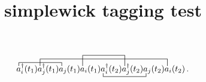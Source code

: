\documentclass{article}
\title{simplewick tagging test}
\begin{document}
\[
\contraction{}{a}{{}^{\dagger}_i(t_1)a^{\dagger}_j(t_1)}{a}
%
\contraction[2ex]{a^{\dagger}_i(t_1)}{a}{%
{}^{\dagger}_j(t_1)a_j(t_1)a_i(t_1)%
a^{\dagger}_i(t_2)a^{\dagger}_j(t_2)a_j(t_2)}{a}
%
\contraction[3ex]{a^{\dagger}_i(t_1)%
a^{\dagger}_j(t_1)a_j(t_1)}{a}{{}_i(t_1)%
a^{\dagger}_i(t_2)}{a}
%
\bcontraction{a^{\dagger}_i(t_1)%
a^{\dagger}_j(t_1)a_j(t_1)a_i(t_1)}%
{a}{{}^{\dagger}_i(t_2)a^{\dagger}_j(t_2)}{a}
%
a^{\dagger}_i(t_1)a^{\dagger}_j(t_1)a_j(t_1)a_i(t_1)
a^{\dagger}_i(t_2)a^{\dagger}_j(t_2)a_j(t_2)a_i(t_2)\,.
\]
\end{document}
